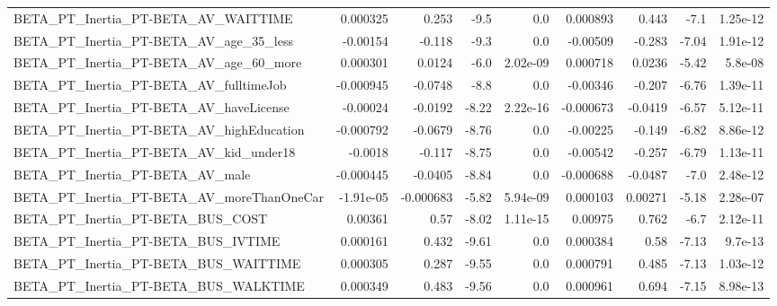 \begin{tabular}{lrrrrrrrr}
BETA\_PT\_Inertia\_PT-BETA\_AV\_WAITTIME                &    0.000325 &        0.253 &     -9.5 &      0.0 &   0.000893 &       0.443 &         -7.1 &      1.25e-12 \\
BETA\_PT\_Inertia\_PT-BETA\_AV\_age\_35\_less             &    -0.00154 &       -0.118 &     -9.3 &      0.0 &   -0.00509 &      -0.283 &        -7.04 &      1.91e-12 \\
BETA\_PT\_Inertia\_PT-BETA\_AV\_age\_60\_more             &    0.000301 &       0.0124 &     -6.0 & 2.02e-09 &   0.000718 &      0.0236 &        -5.42 &       5.8e-08 \\
BETA\_PT\_Inertia\_PT-BETA\_AV\_fulltimeJob             &   -0.000945 &      -0.0748 &     -8.8 &      0.0 &   -0.00346 &      -0.207 &        -6.76 &      1.39e-11 \\
BETA\_PT\_Inertia\_PT-BETA\_AV\_haveLicense             &    -0.00024 &      -0.0192 &    -8.22 & 2.22e-16 &  -0.000673 &     -0.0419 &        -6.57 &      5.12e-11 \\
BETA\_PT\_Inertia\_PT-BETA\_AV\_highEducation           &   -0.000792 &      -0.0679 &    -8.76 &      0.0 &   -0.00225 &      -0.149 &        -6.82 &      8.86e-12 \\
BETA\_PT\_Inertia\_PT-BETA\_AV\_kid\_under18             &     -0.0018 &       -0.117 &    -8.75 &      0.0 &   -0.00542 &      -0.257 &        -6.79 &      1.13e-11 \\
BETA\_PT\_Inertia\_PT-BETA\_AV\_male                    &   -0.000445 &      -0.0405 &    -8.84 &      0.0 &  -0.000688 &     -0.0487 &         -7.0 &      2.48e-12 \\
BETA\_PT\_Inertia\_PT-BETA\_AV\_moreThanOneCar          &   -1.91e-05 &    -0.000683 &    -5.82 & 5.94e-09 &   0.000103 &     0.00271 &        -5.18 &      2.28e-07 \\
BETA\_PT\_Inertia\_PT-BETA\_BUS\_COST                   &     0.00361 &         0.57 &    -8.02 & 1.11e-15 &    0.00975 &       0.762 &         -6.7 &      2.12e-11 \\
BETA\_PT\_Inertia\_PT-BETA\_BUS\_IVTIME                 &    0.000161 &        0.432 &    -9.61 &      0.0 &   0.000384 &        0.58 &        -7.13 &       9.7e-13 \\
BETA\_PT\_Inertia\_PT-BETA\_BUS\_WAITTIME               &    0.000305 &        0.287 &    -9.55 &      0.0 &   0.000791 &       0.485 &        -7.13 &      1.03e-12 \\
BETA\_PT\_Inertia\_PT-BETA\_BUS\_WALKTIME               &    0.000349 &        0.483 &    -9.56 &      0.0 &   0.000961 &       0.694 &        -7.15 &      8.98e-13 \\

\end{tabular}
